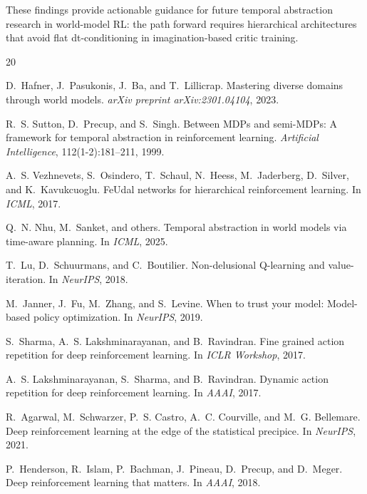 \documentclass[10pt,letterpaper]{article}
\begin{document}
These findings provide actionable guidance for future temporal abstraction research in world-model RL: the path forward requires hierarchical architectures that avoid flat dt-conditioning in imagination-based critic training.


\begin{thebibliography}{20}

D.~Hafner, J.~Pasukonis, J.~Ba, and T.~Lillicrap.
\newblock Mastering diverse domains through world models.
\newblock \emph{arXiv preprint arXiv:2301.04104}, 2023.

R.~S. Sutton, D.~Precup, and S.~Singh.
\newblock Between MDPs and semi-MDPs: A framework for temporal abstraction in reinforcement learning.
\newblock \emph{Artificial Intelligence}, 112(1-2):181--211, 1999.

A.~S. Vezhnevets, S.~Osindero, T.~Schaul, N.~Heess, M.~Jaderberg, D.~Silver, and K.~Kavukcuoglu.
\newblock FeUdal networks for hierarchical reinforcement learning.
\newblock In \emph{ICML}, 2017.

Q.~N. Nhu, M.~Sanket, and others.
\newblock Temporal abstraction in world models via time-aware planning.
\newblock In \emph{ICML}, 2025.

T.~Lu, D.~Schuurmans, and C.~Boutilier.
\newblock Non-delusional Q-learning and value-iteration.
\newblock In \emph{NeurIPS}, 2018.

M.~Janner, J.~Fu, M.~Zhang, and S.~Levine.
\newblock When to trust your model: Model-based policy optimization.
\newblock In \emph{NeurIPS}, 2019.

S.~Sharma, A.~S. Lakshminarayanan, and B.~Ravindran.
\newblock Fine grained action repetition for deep reinforcement learning.
\newblock In \emph{ICLR Workshop}, 2017.

A.~S. Lakshminarayanan, S.~Sharma, and B.~Ravindran.
\newblock Dynamic action repetition for deep reinforcement learning.
\newblock In \emph{AAAI}, 2017.

R.~Agarwal, M.~Schwarzer, P.~S. Castro, A.~C. Courville, and M.~G. Bellemare.
\newblock Deep reinforcement learning at the edge of the statistical precipice.
\newblock In \emph{NeurIPS}, 2021.

P.~Henderson, R.~Islam, P.~Bachman, J.~Pineau, D.~Precup, and D.~Meger.
\newblock Deep reinforcement learning that matters.
\newblock In \emph{AAAI}, 2018.

\end{thebibliography}
\end{document}
